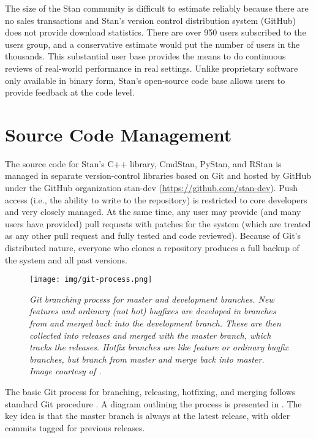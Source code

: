 The size of the Stan community is difficult to estimate reliably
because there are no sales transactions and Stan's version control
distribution system (GitHub) does not provide download statistics.
There are over 950 users subscribed to the users group, and a
conservative estimate would put the number of users in the thousands.
This substantial user base provides the means to do continuous reviews
of real-world performance in real settings. Unlike proprietary
software only available in binary form, Stan's open-source code base
allows users to provide feedback at the code level.

\section{Source Code Management}

The source code for Stan's C++ library, CmdStan, PyStan, and RStan is
managed in separate version-control libraries based on Git
\citep{Chacon:2014} and hosted by GitHub under the GitHub organization
stan-dev (\url{https://github.com/stan-dev}). Push access (i.e., the
ability to write to the repository) is restricted to core developers
and very closely managed. At the same time, any user may provide (and
many users have provided) pull requests with patches for the system
(which are treated as any other pull request and fully tested and code
reviewed). Because of Git's distributed nature, everyone who clones a
repository produces a full backup of the system and all past versions.

\begin{figure}
\begin{center}
\texttt{[image: img/git-process.png]}
\end{center}
\caption{\small\it Git branching process for master
  and development branches.  New features and ordinary (not hot)
  bugfixes are developed in branches from and merged back into the
  development  branch.  These are then
  collected into releases and merged with the master branch, which
  tracks the releases.  Hotfix branches are like feature or ordinary
  bugfix branches, but branch from master and merge back into master.
  Image courtesy of \citep{Driessen:2010}.}\label{git-process.figure} \end{figure}
%
The basic Git process for branching, releasing, hotfixing, and merging
follows standard Git procedure \citep{Driessen:2010}. A diagram
outlining the process is presented in . The key
idea is that the master branch is always at the latest release, with
older commits tagged for previous releases.

